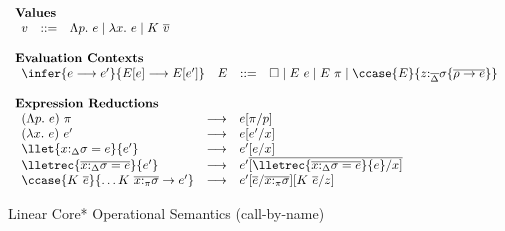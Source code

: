 
\begin{figure}[h]
\begin{framed}
\small
\[
\begin{array}{l}
%
\textbf{Values} \\
\begin{array}{lcl}
    v & ::= & \Lambda p.~e \mid \lambda x.~e \mid K~\overline{v} \\
\end{array}\\\\
%
\textbf{Evaluation Contexts}\\
\begin{array}{llcl}
\infer{e \longrightarrow e'}{E[e] \longrightarrow E[e']} & E & ::= & \square \mid E~e \mid E~\pi \mid \ccase{E}{z{:}_{\overline{\Delta}}\sigma \{\overline{\rho \to e}\}} \\
\end{array}\\\\
%
\textbf{Expression Reductions}\\
\begin{array}{lcl}
(\Lambda p.~e)~\pi & \longrightarrow & e[\pi/p]\\
(\lambda x.~e)~e' & \longrightarrow & e[e'/x]\\
\llet{x{:}_\Delta\sigma = e}{e'} & \longrightarrow & e'[e/x]\\
\lletrec{\overline{x{:}_\Delta\sigma = e}}{e'} & \longrightarrow & e'\overline{[\lletrec{\overline{x{:}_\Delta\sigma = e}}{e}/x]}\\
\ccase{K~\overline{e}}{\dots K~\overline{x{:}_\pi\sigma} \to e'} &
\longrightarrow & e'[\overline{e}/\overline{x{:}_\pi\sigma}][K~\overline{e}/z]\\
\end{array}
\end{array}
\]
\end{framed}
\caption{Linear Core* Operational Semantics \small(call-by-name)}
\label{linear-core-operational-semantics}
\end{figure}

